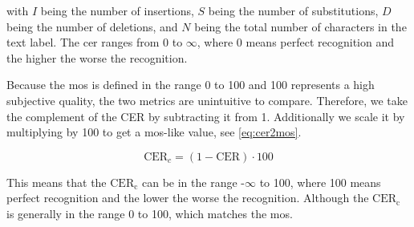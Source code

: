with $I$ being the number of insertions, $S$ being the number of substitutions, $D$ being the number of deletions, and $N$ being the total number of characters in the text label.
The \gls{cer} ranges from 0 to $\infty$, where 0 means perfect recognition and the higher the worse the recognition.


Because the \gls{mos} is defined in the range 0 to 100 and 100 represents a high subjective quality, the two metrics are unintuitive to compare.
Therefore, we take the complement of the CER by subtracting it from 1.
Additionally we scale it by multiplying by 100 to get a \gls{mos}-like value, see \autoref{eq:cer2mos}.

\begin{equation}
    \text{CER}_{c} = (1 - \text{CER}) \cdot 100
    \label{eq:cer2mos}
\end{equation}

This means that the $\text{CER}_{\text{c}}$ can be in the range -$\infty$ to 100, where 100 means perfect recognition and the lower the worse the recognition.
Although the $\text{CER}_{\text{c}}$ is generally in the range 0 to 100, which matches the \gls{mos}.













